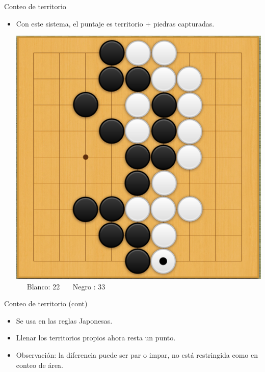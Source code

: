 \documentclass{beamer}
\begin{document}
\begin{frame}{Conteo de territorio}
  
  \begin{itemize}
    \item Con este sistema, el puntaje es territorio $+$ piedras capturadas.
    
    \includegraphics[scale=0.17]{ejemplo-conteo.png} \ \ \ Blanco: 22 \ \ \ Negro : 33  
  \end{itemize}
  
\end{frame}

\begin{frame}{Conteo de territorio (cont)}
  
  \begin{itemize}
    \item Se usa en las reglas Japonesas.
    \item Llenar los territorios propios ahora resta un punto.
    \item Observación: la diferencia puede ser par o impar, no está restringida como en conteo de área.
  \end{itemize}
  
\end{frame}
\end{document}
